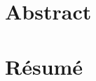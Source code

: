 %
\chapter*{Abstract}
\label{sec:abstract}
\vspace*{-10mm}



\clearpage

\chapter*{Résumé}
\label{sec:abstract-fr}
\vspace*{-10mm}


